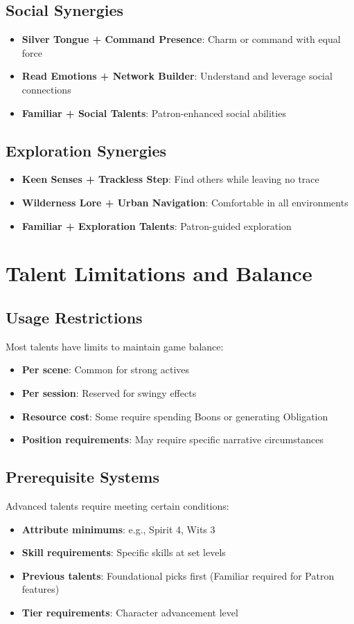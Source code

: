 \subsection*{Social Synergies}
\begin{itemize}
\item \textbf{Silver Tongue + Command Presence}: Charm or command with equal force
\item \textbf{Read Emotions + Network Builder}: Understand and leverage social connections
\item \textbf{Familiar + Social Talents}: Patron-enhanced social abilities
\end{itemize}

\subsection*{Exploration Synergies}
\begin{itemize}
\item \textbf{Keen Senses + Trackless Step}: Find others while leaving no trace
\item \textbf{Wilderness Lore + Urban Navigation}: Comfortable in all environments
\item \textbf{Familiar + Exploration Talents}: Patron-guided exploration
\end{itemize}

\section{Talent Limitations and Balance}

\subsection*{Usage Restrictions}
Most talents have limits to maintain game balance:
\begin{itemize}
\item \textbf{Per scene}: Common for strong actives
\item \textbf{Per session}: Reserved for swingy effects
\item \textbf{Resource cost}: Some require spending Boons or generating Obligation
\item \textbf{Position requirements}: May require specific narrative circumstances
\end{itemize}

\subsection*{Prerequisite Systems}
Advanced talents require meeting certain conditions:
\begin{itemize}
\item \textbf{Attribute minimums}: e.g., Spirit 4, Wits 3
\item \textbf{Skill requirements}: Specific skills at set levels
\item \textbf{Previous talents}: Foundational picks first (Familiar required for Patron features)
\item \textbf{Tier requirements}: Character advancement level
\end{itemize}

